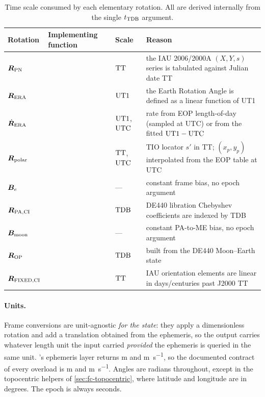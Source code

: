 \begin{table}[H]
  \centering
  \caption{Time scale consumed by each elementary rotation. All are derived
    internally from the single $t_{\TDB}$ argument.}
  \label{tab:fc-timescales}
  \begin{tabularx}{\textwidth}{l l l L}
    \toprule
    Rotation & Implementing function & Scale & Reason \\
    \midrule
    $\bm{R}_{\mathrm{PN}}$    &  & $\mathrm{TT}$   & the IAU 2006/2000A $(X,Y,s)$ series is tabulated against Julian date TT \\
    $\bm{R}_{\mathrm{ERA}}$   &       & $\mathrm{UT1}$ & the Earth Rotation Angle is defined as a linear function of UT1 \\
    $\dot{\bm{R}}_{\mathrm{ERA}}$ &  & $\mathrm{UT1}$, $\mathrm{UTC}$ & rate from EOP length-of-day (sampled at UTC) or from the fitted $\mathrm{UT1}-\mathrm{UTC}$ \\
    $\bm{R}_{\mathrm{polar}}$ &         & $\mathrm{TT}$, $\mathrm{UTC}$ & TIO locator $s'$ in TT; $(x_p,y_p)$ interpolated from the EOP table at UTC \\
    $\bm{B}_e$                &           & ---     & constant frame bias, no epoch argument \\
    $\bm{R}_{\mathrm{PA},\mathrm{CI}}$ &  & $\mathrm{TDB}$  & DE440 libration Chebyshev coefficients are indexed by TDB \\
    $\bm{B}_{\mathrm{moon}}$  &          & ---     & constant PA-to-ME bias, no epoch argument \\
    $\bm{R}_{\mathrm{OP}}$    &          & $\mathrm{TDB}$  & built from the DE440 Moon--Earth state \\
    $\bm{R}_{\mathrm{FIXED},\mathrm{CI}}$ &  & $\mathrm{TT}$ & IAU orientation elements are linear in days/centuries past J2000 TT \\
    \bottomrule
  \end{tabularx}
\end{table}

\paragraph{Units.} Frame conversions are unit-agnostic \emph{for the state}:
they apply a dimensionless rotation and add a translation obtained from the
ephemeris, so the output carries whatever length unit the input carried
\emph{provided} the ephemeris is queried in the same unit. \lupnt{}'s
ephemeris layer returns \si{\meter} and \si{\meter\per\second}, so the
documented contract of every  overload is
\si{\meter} and \si{\meter\per\second}. Angles are radians throughout,
except in the topocentric helpers of \cref{sec:fc-topocentric}, where
latitude and longitude are in degrees. The epoch is always seconds.

